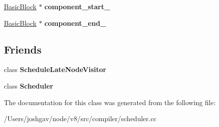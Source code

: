 \begin{DoxyCompactItemize}
\item 
\hyperlink{classv8_1_1internal_1_1compiler_1_1_basic_block}{Basic\+Block} $\ast$ {\bfseries component\+\_\+start\+\_\+}\hypertarget{classv8_1_1internal_1_1compiler_1_1_c_f_g_builder_ace7d646ad548bb7d4077256eaaf39e0a}{}\label{classv8_1_1internal_1_1compiler_1_1_c_f_g_builder_ace7d646ad548bb7d4077256eaaf39e0a}

\item 
\hyperlink{classv8_1_1internal_1_1compiler_1_1_basic_block}{Basic\+Block} $\ast$ {\bfseries component\+\_\+end\+\_\+}\hypertarget{classv8_1_1internal_1_1compiler_1_1_c_f_g_builder_aaf56db3790753776d29ada129c46001e}{}\label{classv8_1_1internal_1_1compiler_1_1_c_f_g_builder_aaf56db3790753776d29ada129c46001e}

\end{DoxyCompactItemize}
\subsection*{Friends}
\begin{DoxyCompactItemize}
\item 
class {\bfseries Schedule\+Late\+Node\+Visitor}\hypertarget{classv8_1_1internal_1_1compiler_1_1_c_f_g_builder_a1323738e293e91819df22cb24f986016}{}\label{classv8_1_1internal_1_1compiler_1_1_c_f_g_builder_a1323738e293e91819df22cb24f986016}

\item 
class {\bfseries Scheduler}\hypertarget{classv8_1_1internal_1_1compiler_1_1_c_f_g_builder_afb88c77ea5daaefa6c8fa6bc5b9aa5c1}{}\label{classv8_1_1internal_1_1compiler_1_1_c_f_g_builder_afb88c77ea5daaefa6c8fa6bc5b9aa5c1}

\end{DoxyCompactItemize}


The documentation for this class was generated from the following file\+:\begin{DoxyCompactItemize}
\item 
/\+Users/joshgav/node/v8/src/compiler/scheduler.\+cc\end{DoxyCompactItemize}

